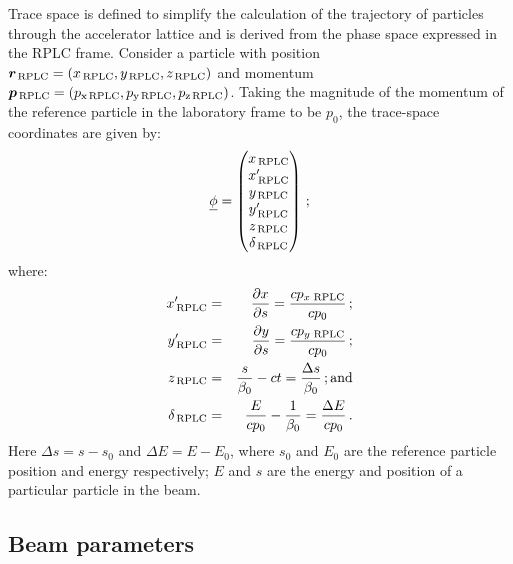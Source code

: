 Trace space is defined to simplify the calculation of the trajectory
of particles through the accelerator lattice and is derived from the
phase space expressed in the RPLC frame.
Consider a particle with position
$\bm{r}_{\rm\,RPLC}=(x_{\rm\,RPLC}, y_{\rm\,RPLC}, z_{\rm\,RPLC})$ and
momentum
$\bm{p}_{\rm\,RPLC} = (p_{\rm x\,RPLC}, p_{\rm y\,RPLC}, p_{\rm z\,RPLC})$.
Taking the magnitude of the momentum of the reference particle in the
laboratory frame to be $p_0$, the trace-space coordinates are given
by:
\begin{equation}
    \underline{\phi} = \begin{pmatrix}
                        x_{\rm\,RPLC}       \\
                        x^\prime_{\rm\,RPLC} \\
                        y_{\rm\,RPLC}       \\
                        y^\prime_{\rm\,RPLC} \\
                        z_{\rm\,RPLC}       \\
                        \delta_{\rm\,RPLC}
                      \end{pmatrix} \, ;
\end{equation}
where:
\begin{eqnarray}
  x^\prime_{\rm\,RPLC}  & = & \frac{\partial x}{\partial s}
                        = \frac{cp_{x\,{\rm\,RPLC}}}{cp_0} \, ; \\
  y^\prime_{\rm\,RPLC}  & = & \frac{\partial y}{\partial s}
                        = \frac{cp_{y\,{\rm\,RPLC}}}{cp_0} \, ; \\
  z_{\rm\,RPLC}        & = & \frac{s}{\beta_0} - ct
                       = \frac{\Delta s}{\beta_0}             \, {\rm ; and} \\
  \delta_{\rm\,RPLC}   & = & \frac{E}{c p_0} - \frac{1}{\beta_0}
                        = \frac{\Delta E}{cp_0}                   \, .    
\end{eqnarray}
Here $\Delta s = s - s_0$ and $\Delta E = E - E_0$, where $s_0$ and
$E_0$ are the reference particle position and energy respectively; $E$
and $s$ are the energy and position of a particular particle in the
beam.

\subsection{Beam parameters}

